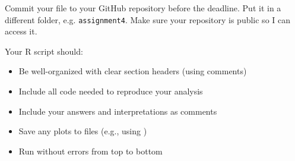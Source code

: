Commit your file to your GitHub repository before the deadline. Put it in a different folder, e.g. \texttt{assignment4}. Make sure your repository is public so I can access it.

Your R script should:
\begin{itemize}
  \item Be well-organized with clear section headers (using comments)
  \item Include all code needed to reproduce your analysis
  \item Include your answers and interpretations as comments
  \item Save any plots to files (e.g., using )
  \item Run without errors from top to bottom
\end{itemize}


